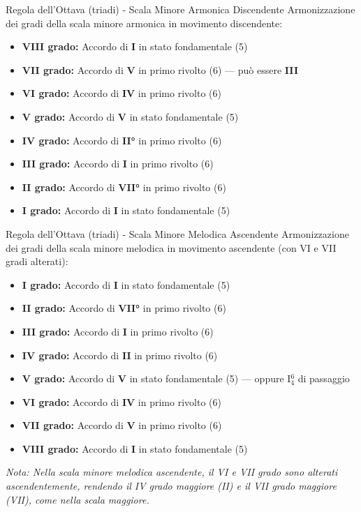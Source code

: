 \begin{regola}{Regola dell'Ottava (triadi) - Scala Minore Armonica Discendente}
	\label{reg:regola_ottava_minore_disc}
	Armonizzazione dei gradi della scala minore armonica in movimento discendente:
	
	\begin{itemize}
		\item \textbf{VIII grado:} Accordo di \textbf{I} in stato fondamentale (5)
		\item \textbf{VII grado:} Accordo di \textbf{V} in primo rivolto (6) — può essere \textbf{III}
		\item \textbf{VI grado:} Accordo di \textbf{IV} in primo rivolto (6)
		\item \textbf{V grado:} Accordo di \textbf{V} in stato fondamentale (5)
		\item \textbf{IV grado:} Accordo di \textbf{II°} in primo rivolto (6)
		\item \textbf{III grado:} Accordo di \textbf{I} in primo rivolto (6)
		\item \textbf{II grado:} Accordo di \textbf{VII°} in primo rivolto (6)
		\item \textbf{I grado:} Accordo di \textbf{I} in stato fondamentale (5)
	\end{itemize}
\end{regola}



\begin{regola}{Regola dell'Ottava (triadi) - Scala Minore Melodica Ascendente}
	\label{reg:regola_ottava_melodica_asc}
	Armonizzazione dei gradi della scala minore melodica in movimento ascendente (con VI e VII gradi alterati):
	
	\begin{itemize}
		\item \textbf{I grado:} Accordo di \textbf{I} in stato fondamentale (5)
		\item \textbf{II grado:} Accordo di \textbf{VII°} in primo rivolto (6)
		\item \textbf{III grado:} Accordo di \textbf{I} in primo rivolto (6)
		\item \textbf{IV grado:} Accordo di \textbf{II} in primo rivolto (6)
		\item \textbf{V grado:} Accordo di \textbf{V} in stato fondamentale (5) — oppure I$^6_4$ di passaggio
		\item \textbf{VI grado:} Accordo di \textbf{IV} in primo rivolto (6)
		\item \textbf{VII grado:} Accordo di \textbf{V} in primo rivolto (6)
		\item \textbf{VIII grado:} Accordo di \textbf{I} in stato fondamentale (5)
	\end{itemize}
	
	\textit{Nota: Nella scala minore melodica ascendente, il VI e VII grado sono alterati ascendentemente, rendendo il IV grado maggiore (II) e il VII grado maggiore (VII), come nella scala maggiore.}
\end{regola}


